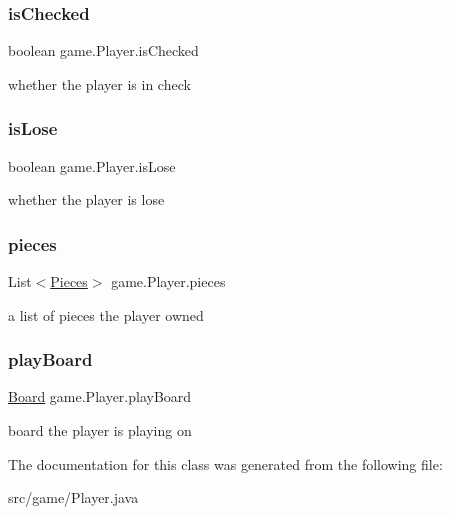 \subsubsection{\texorpdfstring{is\+Checked}{isChecked}}
{\footnotesize\ttfamily boolean game.\+Player.\+is\+Checked}

whether the player is in check \mbox{\label{classgame_1_1_player_a3016e4b3cc8dae43ad3e08d31c8a5e3b}} 
\subsubsection{\texorpdfstring{is\+Lose}{isLose}}
{\footnotesize\ttfamily boolean game.\+Player.\+is\+Lose}

whether the player is lose \mbox{\label{classgame_1_1_player_a9028dcf4027ecd82c1d9494f7e304960}} 
\subsubsection{\texorpdfstring{pieces}{pieces}}
{\footnotesize\ttfamily List$<$\mbox{\hyperlink{classpieces_1_1_pieces}{Pieces}}$>$ game.\+Player.\+pieces}

a list of pieces the player owned \mbox{\label{classgame_1_1_player_a00d2553d16a3ade53d5671421fa8dcf6}} 
\subsubsection{\texorpdfstring{play\+Board}{playBoard}}
{\footnotesize\ttfamily \mbox{\hyperlink{classgame_1_1_board}{Board}} game.\+Player.\+play\+Board}

board the player is playing on 

The documentation for this class was generated from the following file\+:\begin{DoxyCompactItemize}
\item 
src/game/Player.\+java\end{DoxyCompactItemize}
